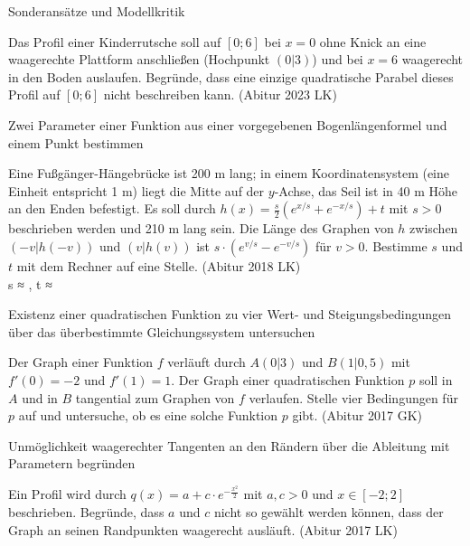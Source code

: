 \begin{aufgabe}{Sonderansätze und Modellkritik}
\begin{teile}
\teil Das Profil einer Kinderrutsche soll auf $[0; 6]$ bei $x = 0$ ohne Knick an eine waagerechte Plattform anschließen (Hochpunkt $(0|3)$) und bei $x = 6$ waagerecht in den Boden auslaufen. Begründe, dass eine einzige quadratische Parabel dieses Profil auf $[0; 6]$ nicht beschreiben kann. \hfill (Abitur 2023 LK)
\end{teile}
\end{aufgabe}

\begin{aufgabe}{Zwei Parameter einer Funktion aus einer vorgegebenen Bogenlängenformel und einem Punkt bestimmen}
\begin{teile}
\teil Eine Fußgänger-Hängebrücke ist 200 m lang; in einem Koordinatensystem (eine Einheit entspricht 1 m) liegt die Mitte auf der $y$-Achse, das Seil ist in 40 m Höhe an den Enden befestigt. Es soll durch $h(x) = \frac{s}{2}\left(e^{x/s} + e^{-x/s}\right) + t$ mit $s > 0$ beschrieben werden und 210 m lang sein. Die Länge des Graphen von $h$ zwischen $(-v|h(-v))$ und $(v|h(v))$ ist $s \cdot \left(e^{v/s} - e^{-v/s}\right)$ für $v > 0$. Bestimme $s$ und $t$ mit dem Rechner auf eine Stelle. \hfill (Abitur 2018 LK) \\ s ≈ \leerfeld , t ≈ \leerfeld
\end{teile}
\end{aufgabe}

\begin{aufgabe}{Existenz einer quadratischen Funktion zu vier Wert- und Steigungsbedingungen über das überbestimmte Gleichungssystem untersuchen}
\begin{teile}
\teil Der Graph einer Funktion $f$ verläuft durch $A(0|3)$ und $B(1|0{,}5)$ mit $f'(0) = -2$ und $f'(1) = 1$. Der Graph einer quadratischen Funktion $p$ soll in $A$ und in $B$ tangential zum Graphen von $f$ verlaufen. Stelle vier Bedingungen für $p$ auf und untersuche, ob es eine solche Funktion $p$ gibt. \hfill (Abitur 2017 GK)
\end{teile}
\end{aufgabe}

\begin{aufgabe}{Unmöglichkeit waagerechter Tangenten an den Rändern über die Ableitung mit Parametern begründen}
\begin{teile}
\teil Ein Profil wird durch $q(x) = a + c \cdot e^{-\frac{x^2}{2}}$ mit $a, c > 0$ und $x \in [-2; 2]$ beschrieben. Begründe, dass $a$ und $c$ nicht so gewählt werden können, dass der Graph an seinen Randpunkten waagerecht ausläuft. \hfill (Abitur 2017 LK)
\end{teile}
\end{aufgabe}

